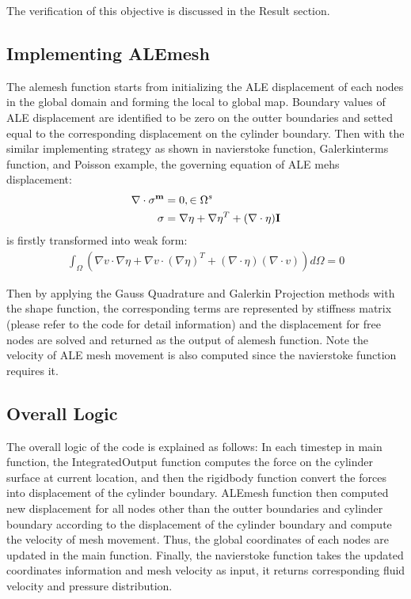 \documentclass[a4paper,12pt]{article} %
\begin{document}
The verification of this objective is discussed in the Result section.

\subsection*{Implementing ALEmesh}
The alemesh function starts from initializing the ALE displacement of each nodes in the global domain and forming
the local to global map. Boundary values of ALE displacement are identified to be zero on the outter boundaries and
setted equal to the corresponding displacement on the cylinder boundary.
Then with the similar implementing strategy as shown in navierstoke function, Galerkinterms function, and Poisson 
example, the governing equation of ALE mehs displacement:
\begin{align*}
    \nabla \cdot \mathbf{\sigma^m} &= 0,    \in \Omega^s \\                                      
    \mathbf{\sigma} &= \nabla \mathbf{\eta} + \nabla \mathbf{\eta}^T + (\nabla \cdot \mathbf{\eta})\mathbf{I}
\end{align*}
is firstly transformed into weak form:
\begin{align*}
    \int_{\Omega} \left( \nabla v \cdot \nabla \eta + \nabla v \cdot (\nabla \eta)^T + (\nabla \cdot \eta)(\nabla \cdot v) \right) d\Omega = 0
\end{align*}

Then by applying the Gauss Quadrature and Galerkin Projection methods with the shape function, the corresponding terms 
are represented by stiffness matrix (please refer to the code for detail information) and the displacement for free nodes 
are solved and returned as the output of alemesh function. Note the velocity of ALE mesh movement is also computed since 
the navierstoke function requires it. 

\subsection*{Overall Logic}
The overall logic of the code is explained as follows: In each timestep in main function, the IntegratedOutput function computes the force on the cylinder surface at current location, and then 
the rigidbody function convert the forces into displacement of the cylinder boundary. ALEmesh function then computed new 
displacement for all nodes other than the outter boundaries and cylinder boundary according to the displacement of the 
cylinder boundary and compute the velocity of mesh movement. Thus, the global coordinates of each nodes are updated 
in the main function. Finally, the navierstoke function takes the updated coordinates information and mesh velocity as input,
it returns corresponding fluid velocity and pressure distribution.
\end{document}
